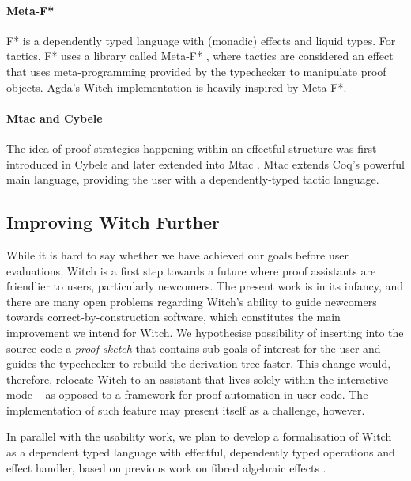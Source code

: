 \documentclass[sigconfl]{acmart}
\begin{document}
\paragraph{Meta-F*} F* is a dependently typed language with (monadic) effects and liquid
types. For tactics, F* uses a library called Meta-F* \cite{MetaFstar}, where tactics are
considered an effect that uses meta-programming provided by the typechecker to
manipulate proof objects. Agda's Witch implementation is heavily inspired by Meta-F*.

\paragraph{Mtac and Cybele} The idea of proof strategies happening within an
effectful structure was first introduced in Cybele \cite{Claret2013} and later extended into Mtac \cite{Ziliani2013}.
Mtac extends Coq's powerful main language, providing the user with a
dependently-typed tactic language.

\subsection{Improving Witch Further}
While it is hard to say whether we have achieved our goals before user
evaluations, Witch is a first step towards a future where proof assistants are
friendlier to users, particularly newcomers. The present work is in its
infancy, and there are many open problems regarding Witch's ability to guide newcomers
towards correct-by-construction software, which constitutes the main improvement
we intend for Witch. We hypothesise possibility of inserting into the source
code a  \textit{proof sketch} that contains sub-goals of interest for the user and guides the
typechecker to rebuild the derivation tree faster. This change would, therefore,
relocate Witch to an assistant that lives solely
within the interactive mode -- as opposed to a framework for proof
automation in user code. The implementation of such feature may present itself
as a challenge, however.

In parallel with the usability work, we plan to develop a formalisation of Witch
as a dependent typed language with effectful, dependently typed operations and
effect handler, based on previous work on fibred algebraic effects
\cite{DBLP:journals/pacmpl/Ahman18}.


\end{document}
